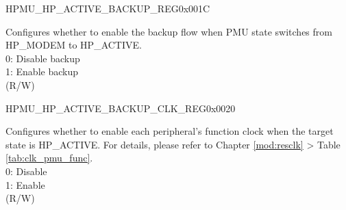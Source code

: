 \begin{register}{H}{PMU\_HP\_ACTIVE\_BACKUP\_REG}{0x001C}
\begin{regdesc}
\begin{reglist}
\label{fielddesc:PMUHPMODEM2ACTIVEBACKUPEN}\item [PMU\_HP\_MODEM2ACTIVE\_BACKUP\_EN] Configures whether to enable the backup flow when PMU state switches from HP\_MODEM to HP\_ACTIVE.\\
0: Disable backup\\
1: Enable backup\\
(R/W)
\end{reglist}\end{regdesc}
\end{register}


\begin{register}{H}{PMU\_HP\_ACTIVE\_BACKUP\_CLK\_REG}{0x0020}\label{regdesc:PMUHPACTIVEBACKUPCLKREG}
%
\regnewline%
\begin{regdesc}\begin{reglist}
\label{fielddesc:PMUHPACTIVEBACKUPICGFUNCEN}\item [PMU\_HP\_ACTIVE\_BACKUP\_ICG\_FUNC\_EN] Configures whether to enable each peripheral's function clock when the target state is HP\_ACTIVE. For details, please refer to Chapter \ref{mod:resclk} \textit{} > Table \ref{tab:clk_pmu_func}.\\
0: Disable\\
1: Enable\\
(R/W)
\end{reglist}\end{regdesc}
\end{register}


